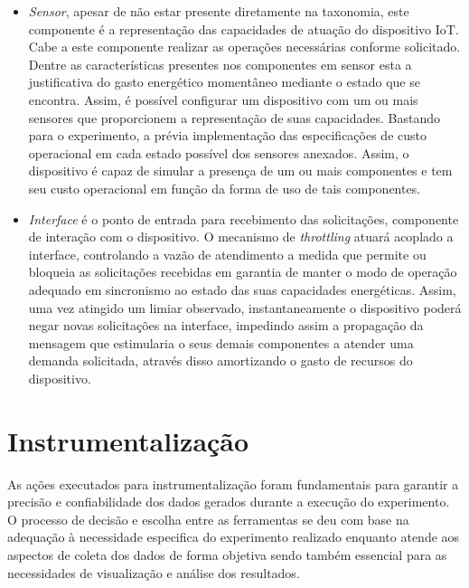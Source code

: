 \begin{itemize}
\begin{table}[htbp]
	\end{table}
	\endgroup
	
	
	 \item \textit{Sensor}, apesar de não estar presente diretamente na taxonomia, este componente é a representação das capacidades de atuação do dispositivo \acs{IoT}. Cabe a este componente realizar as operações necessárias conforme solicitado. Dentre as características presentes nos componentes em sensor esta a justificativa do gasto energético momentâneo mediante o estado que se encontra. Assim, é possível configurar um dispositivo com um ou mais sensores que proporcionem a representação de suas capacidades. Bastando para o experimento, a prévia implementação das especificações de custo operacional em cada estado possível dos sensores anexados. Assim, o dispositivo é capaz de simular a presença de um ou mais componentes e tem seu custo operacional em função da forma de uso de tais componentes.
	 
	 \item \textit{Interface} é o ponto de entrada para recebimento das solicitações, componente de interação com o dispositivo. O mecanismo de \textit{throttling} atuará acoplado a interface, controlando a vazão de atendimento a medida que permite ou bloqueia as solicitações recebidas em garantia de manter o modo de operação adequado em sincronismo ao estado das suas capacidades energéticas. Assim, uma vez atingido um limiar observado, instantaneamente o dispositivo poderá negar novas solicitações na interface, impedindo assim a propagação da mensagem que estimularia o seus demais componentes a atender uma demanda solicitada, através disso amortizando o gasto de recursos do dispositivo.
	 
\end{itemize}

\section{Instrumentalização}
\label{cap6:instrumentalizacao}
As ações executados para instrumentalização foram fundamentais para garantir a precisão e confiabilidade dos dados gerados durante a execução do experimento. O processo de decisão e escolha entre as ferramentas se deu com base na adequação à necessidade especifica do experimento realizado enquanto atende aos aspectos de coleta dos dados de forma objetiva sendo também essencial para as necessidades de visualização e análise dos resultados.

